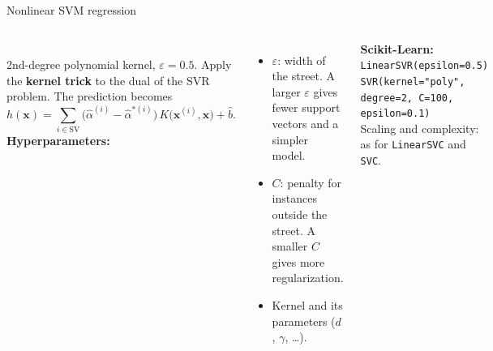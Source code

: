 \documentclass[aspectratio=169,10pt]{beamer}
\newcommand{\x}{\mathbf{x}}
\newcommand{\regnoise}{0.3/0.3,0.8/-0.4,1.2/0.1,1.7/0.5,2.1/-0.2,2.6/-0.6,3.0/0.2,3.4/0.7,3.9/-0.3,4.3/0.1,4.8/-0.5,5.2/0.4,5.7/-0.1}
\begin{document}
\begin{frame}{Nonlinear SVM regression}
\begin{columns}[c]
\centering
{}\\
\scriptsize 2nd-degree polynomial kernel, $\varepsilon=0.5$.
\small
Apply the \textbf{kernel trick} to the dual of the SVR problem. The prediction becomes
\[
  h(\x) = \sum_{i\in\text{SV}}\big(\hat\alpha^{(i)}-\hat\alpha^{*(i)}\big)\,K\big(\x^{(i)},\x\big) + \hat b .
\]
\textbf{Hyperparameters:}
\begin{itemize}
  \item $\varepsilon$: width of the street. A larger $\varepsilon$ gives fewer support vectors and a simpler model.
  \item $C$: penalty for instances outside the street. A smaller $C$ gives more regularization.
  \item Kernel and its parameters ($d$, $\gamma$, \dots).
\end{itemize}
\textbf{Scikit-Learn:}\\[2pt]
\scriptsize
\texttt{LinearSVR(epsilon=0.5)}\\
\texttt{SVR(kernel="poly", degree=2, C=100, epsilon=0.1)}\\
\small
Scaling and complexity: as for \texttt{LinearSVC} and \texttt{SVC}.
\end{columns}
\end{frame}
\end{document}
